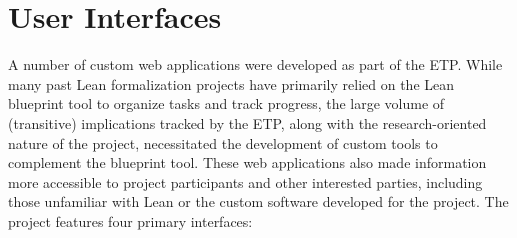 \section{User Interfaces}

A number of custom web applications were developed as part of the ETP. While many past Lean formalization projects have primarily relied on the Lean blueprint tool to organize tasks and track progress, the large volume of (transitive) implications tracked by the ETP, along with the research-oriented nature of the project, necessitated the development of custom tools to complement the blueprint tool. These web applications also made information more accessible to project participants and other interested parties, including those unfamiliar with Lean or the custom software developed for the project. The project features four primary interfaces:


